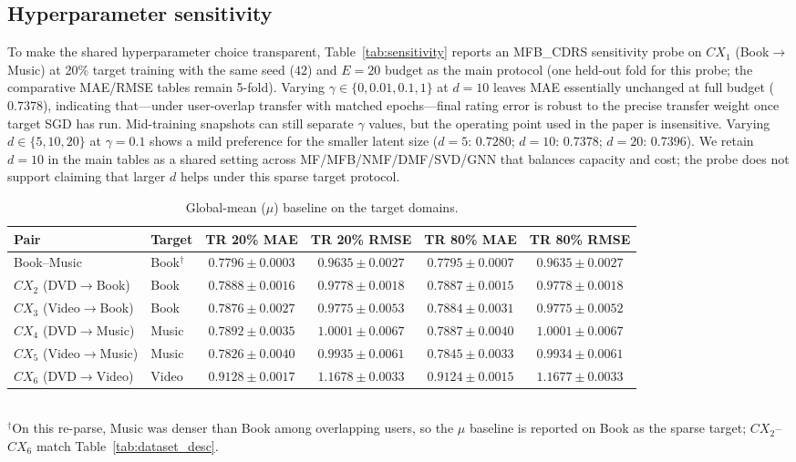 \documentclass[pdflatex,sn-mathphys-num]{sn-jnl}%
\theoremstyle{thmstyleone}%
\theoremstyle{thmstyletwo}%
\theoremstyle{thmstylethree}%
\begin{document}
\subsection{Hyperparameter sensitivity}\label{sec:sensitivity}
To make the shared hyperparameter choice transparent, Table~\ref{tab:sensitivity} reports an MFB\_CDRS sensitivity probe on $CX_1$ (Book$\to$Music) at 20\% target training with the same seed ($42$) and $E=20$ budget as the main protocol (one held-out fold for this probe; the comparative MAE/RMSE tables remain 5-fold). Varying $\gamma\in\{0,0.01,0.1,1\}$ at $d=10$ leaves MAE essentially unchanged at full budget ($0.7378$), indicating that---under user-overlap transfer with matched epochs---final rating error is robust to the precise transfer weight once target SGD has run. Mid-training snapshots can still separate $\gamma$ values, but the operating point used in the paper is insensitive. Varying $d\in\{5,10,20\}$ at $\gamma=0.1$ shows a mild preference for the smaller latent size ($d=5$: $0.7280$; $d=10$: $0.7378$; $d=20$: $0.7396$). We retain $d=10$ in the main tables as a shared setting across MF/MFB/NMF/DMF/SVD/GNN that balances capacity and cost; the probe does not support claiming that larger $d$ helps under this sparse target protocol.

\begin{table}[!htbp]
\centering
\caption{Global-mean ($\mu$) baseline on the target domains.}
\label{tab:mu_baseline}
\renewcommand{\arraystretch}{1.15}
\setlength{\tabcolsep}{3pt}
\small
\begin{tabularx}{\textwidth}{>{\raggedright\arraybackslash}X l cccc}
\toprule
\textbf{Pair} & \textbf{Target} & \textbf{TR 20\% MAE} & \textbf{TR 20\% RMSE} & \textbf{TR 80\% MAE} & \textbf{TR 80\% RMSE} \\
\midrule
Book--Music & Book$^{\dagger}$ & $0.7796\pm0.0003$ & $0.9635\pm0.0027$ & $0.7795\pm0.0007$ & $0.9635\pm0.0027$ \\
$CX_2$ (DVD$\to$Book) & Book & $0.7888\pm0.0016$ & $0.9778\pm0.0018$ & $0.7887\pm0.0015$ & $0.9778\pm0.0018$ \\
$CX_3$ (Video$\to$Book) & Book & $0.7876\pm0.0027$ & $0.9775\pm0.0053$ & $0.7884\pm0.0031$ & $0.9775\pm0.0052$ \\
$CX_4$ (DVD$\to$Music) & Music & $0.7892\pm0.0035$ & $1.0001\pm0.0067$ & $0.7887\pm0.0040$ & $1.0001\pm0.0067$ \\
$CX_5$ (Video$\to$Music) & Music & $0.7826\pm0.0040$ & $0.9935\pm0.0061$ & $0.7845\pm0.0033$ & $0.9934\pm0.0061$ \\
$CX_6$ (DVD$\to$Video) & Video & $0.9128\pm0.0017$ & $1.1678\pm0.0033$ & $0.9124\pm0.0015$ & $1.1677\pm0.0033$ \\
\bottomrule
\end{tabularx}\\[0.3em]
\footnotesize{$^{\dagger}$On this re-parse, Music was denser than Book among overlapping users, so the $\mu$ baseline is reported on Book as the sparse target; $CX_2$--$CX_6$ match Table~\ref{tab:dataset_desc}.}
\end{table}
\end{document}
